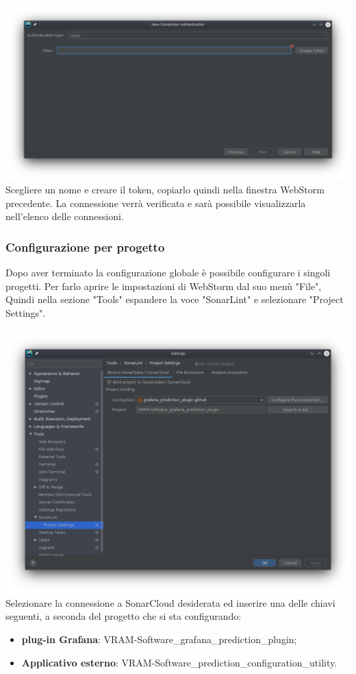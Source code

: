 \\
\\
\includegraphics[width=\textwidth,height=\textheight,keepaspectratio]{img/token.png}
\\
Scegliere un nome e creare il token, copiarlo quindi nella finestra WebStorm precedente.
La connessione verrà verificata e sarà possibile visualizzarla nell'elenco delle connessioni.
\subsubsection{Configurazione per progetto}
Dopo aver terminato la configurazione globale è possibile configurare i singoli progetti. Per farlo aprire le impostazioni di WebStorm dal suo menù "File", Quindi nella sezione "Tools" espandere la voce "SonarLint" e selezionare "Project Settings".
\\
\\
\includegraphics[width=\textwidth,height=\textheight,keepaspectratio]{img/sonarlint-project.png}
Selezionare la connessione a SonarCloud desiderata ed inserire una delle chiavi seguenti, a seconda del progetto che si sta configurando:
\begin{itemize}
	\item \textbf{plug-in Grafana}: VRAM-Software\_grafana\_prediction\_plugin;
	\item \textbf{Applicativo esterno}: VRAM-Software\_prediction\_configuration\_utility.
\end{itemize}

